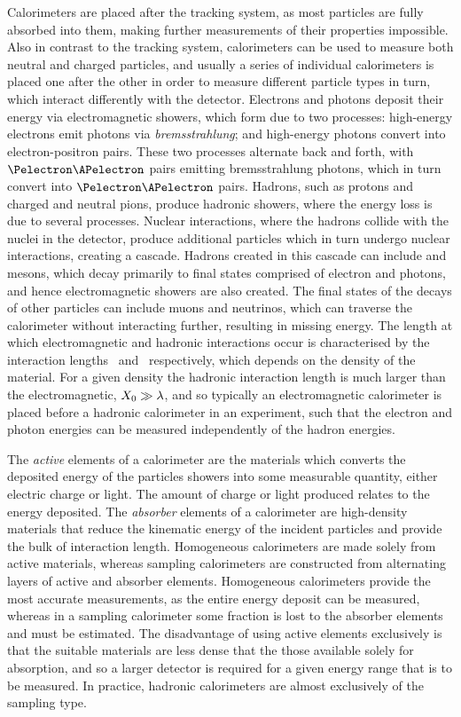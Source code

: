 Calorimeters are placed after the tracking system, as most particles are fully 
absorbed into them, making further measurements of their properties impossible.
Also in contrast to the tracking system, calorimeters can be used to measure 
both neutral and charged particles, and usually a series of individual 
calorimeters is placed one after the other in order to measure different 
particle types in turn, which interact differently with the detector.
Electrons and photons deposit their energy via electromagnetic showers, which 
form due to two processes: high-energy electrons emit photons via 
\emph{bremsstrahlung}; and high-energy photons convert into electron-positron 
pairs.
These two processes alternate back and forth, with $\Pelectron\APelectron$ 
pairs emitting bremsstrahlung photons, which in turn convert into 
$\Pelectron\APelectron$ pairs.
Hadrons, such as protons and charged and neutral pions, produce hadronic 
showers, where the energy loss is due to several processes.
Nuclear interactions, where the hadrons collide with the nuclei in the 
detector, produce additional particles which in turn undergo nuclear 
interactions, creating a cascade.
Hadrons created in this cascade can include \Ppizero and \Peta mesons, which 
decay primarily to final states comprised of electron and photons, and hence 
electromagnetic showers are also created.
The final states of the decays of other particles can include muons and 
neutrinos, which can traverse the calorimeter without interacting further, 
resulting in missing energy.
The length at which electromagnetic and hadronic interactions occur is 
characterised by the interaction lengths \radlen\ and \hadlen\ respectively, 
which depends on the density of the material.
For a given density the hadronic interaction length is much larger than the 
electromagnetic, $X_{0} \gg \lambda$, and so typically an electromagnetic 
calorimeter is placed before a hadronic calorimeter in an experiment, such that 
the electron and photon energies can be measured independently of the hadron 
energies.

The \emph{active} elements of a calorimeter are the materials which converts 
the deposited energy of the particles showers into some measurable quantity, 
either electric charge or light.
The amount of charge or light produced relates to the energy deposited.
The \emph{absorber} elements of a calorimeter are high-density materials that 
reduce the kinematic energy of the incident particles and provide the bulk of 
interaction length.
Homogeneous calorimeters are made solely from active materials, whereas 
sampling calorimeters are constructed from alternating layers of active and 
absorber elements.
Homogeneous calorimeters provide the most accurate measurements, as the entire 
energy deposit can be measured, whereas in a sampling calorimeter some fraction 
is lost to the absorber elements and must be estimated.
The disadvantage of using active elements exclusively is that the suitable 
materials are less dense that the those available solely for absorption, and so 
a larger detector is required for a given energy range that is to be measured.
In practice, hadronic calorimeters are almost exclusively of the sampling type.

